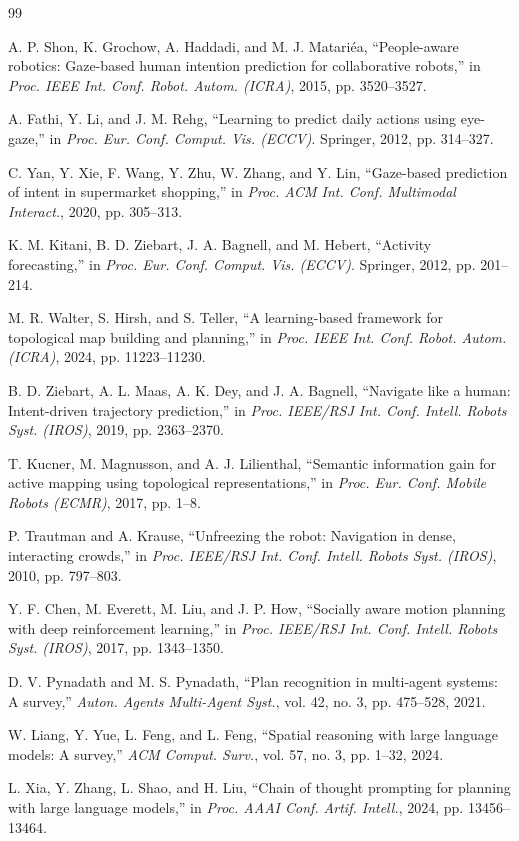 \documentclass[letterpaper]{article}
\begin{document}
\begin{thebibliography}{99}

A. P. Shon, K. Grochow, A. Haddadi, and M. J. Matari{\'{e}}a, ``People-aware robotics: Gaze-based human intention prediction for collaborative robots,'' in \textit{Proc. IEEE Int. Conf. Robot. Autom. (ICRA)}, 2015, pp. 3520--3527.

A. Fathi, Y. Li, and J. M. Rehg, ``Learning to predict daily actions using eye-gaze,'' in \textit{Proc. Eur. Conf. Comput. Vis. (ECCV)}. Springer, 2012, pp. 314--327.

C. Yan, Y. Xie, F. Wang, Y. Zhu, W. Zhang, and Y. Lin, ``Gaze-based prediction of intent in supermarket shopping,'' in \textit{Proc. ACM Int. Conf. Multimodal Interact.}, 2020, pp. 305--313.

K. M. Kitani, B. D. Ziebart, J. A. Bagnell, and M. Hebert, ``Activity forecasting,'' in \textit{Proc. Eur. Conf. Comput. Vis. (ECCV)}. Springer, 2012, pp. 201--214.

M. R. Walter, S. Hirsh, and S. Teller, ``A learning-based framework for topological map building and planning,'' in \textit{Proc. IEEE Int. Conf. Robot. Autom. (ICRA)}, 2024, pp. 11223--11230.

B. D. Ziebart, A. L. Maas, A. K. Dey, and J. A. Bagnell, ``Navigate like a human: Intent-driven trajectory prediction,'' in \textit{Proc. IEEE/RSJ Int. Conf. Intell. Robots Syst. (IROS)}, 2019, pp. 2363--2370.

T. Kucner, M. Magnusson, and A. J. Lilienthal, ``Semantic information gain for active mapping using topological representations,'' in \textit{Proc. Eur. Conf. Mobile Robots (ECMR)}, 2017, pp. 1--8.

P. Trautman and A. Krause, ``Unfreezing the robot: Navigation in dense, interacting crowds,'' in \textit{Proc. IEEE/RSJ Int. Conf. Intell. Robots Syst. (IROS)}, 2010, pp. 797--803.

Y. F. Chen, M. Everett, M. Liu, and J. P. How, ``Socially aware motion planning with deep reinforcement learning,'' in \textit{Proc. IEEE/RSJ Int. Conf. Intell. Robots Syst. (IROS)}, 2017, pp. 1343--1350.

D. V. Pynadath and M. S. Pynadath, ``Plan recognition in multi-agent systems: A survey,'' \textit{Auton. Agents Multi-Agent Syst.}, vol. 42, no. 3, pp. 475--528, 2021.

W. Liang, Y. Yue, L. Feng, and L. Feng, ``Spatial reasoning with large language models: A survey,'' \textit{ACM Comput. Surv.}, vol. 57, no. 3, pp. 1--32, 2024.

L. Xia, Y. Zhang, L. Shao, and H. Liu, ``Chain of thought prompting for planning with large language models,'' in \textit{Proc. AAAI Conf. Artif. Intell.}, 2024, pp. 13456--13464.

\end{thebibliography}
\end{document}
